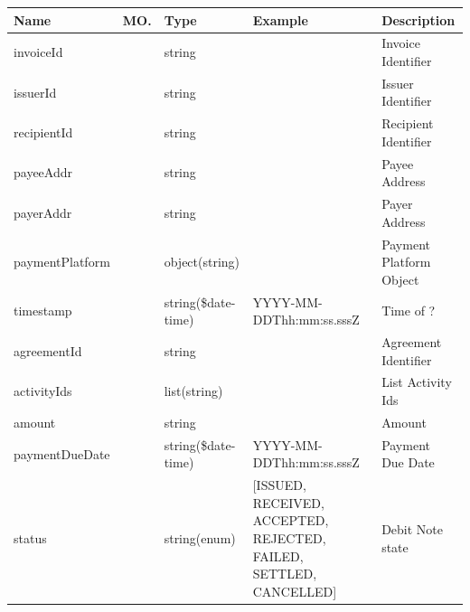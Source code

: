 \begin{enumerate}
\begin{tcolorbox}[boxrule=0pt, frame empty]
\begin{verbatim}
\end{verbatim}
\end{tcolorbox}

\begin{table}[H]
\footnotesize

\begin{center}
\begin{tabular}{|p{3cm}|l|p{3cm}|p{3cm}|p{4cm}|} 
\hline
\rowcolor{lightgray}	Name	& MO.	& Type	& Example & 	Description \\
\hline

invoiceId				&	&	string				&																		&	Invoice Identifier \\
\hline   

issuerId				&	&	string				&																		&	Issuer Identifier \\
\hline   
  
recipientId				&	&	string				&																		&	Recipient Identifier \\
\hline   

payeeAddr				&	&	string				&																		&	Payee Address \\
\hline   
  
payerAddr				&	&	string				&																		&	Payer Address \\
\hline
   
paymentPlatform			&	&	object(string)		&																		&	Payment Platform Object \\
\hline

timestamp				&   &	string(\$date-time)	&	YYYY-MM-DDThh:mm:ss.sssZ											&	Time of ? \\
\hline

agreementId				& 	& 	string				&																		&	Agreement Identifier \\ 
\hline

activityIds				& 	& 	list(string)		&																		&	List Activity Ids \\ 
\hline

amount					& 	& 	string				&																		&	Amount  \\ 
\hline

paymentDueDate			&   &	string(\$date-time)	&	YYYY-MM-DDThh:mm:ss.sssZ											&	Payment Due Date \\
\hline

status					&	&	string(enum)		&	[ISSUED, RECEIVED, ACCEPTED, REJECTED, FAILED, SETTLED, CANCELLED]	& 	Debit Note state \\	
\hline


\end{tabular}
\end{center}
\end{table}
\end{enumerate}

